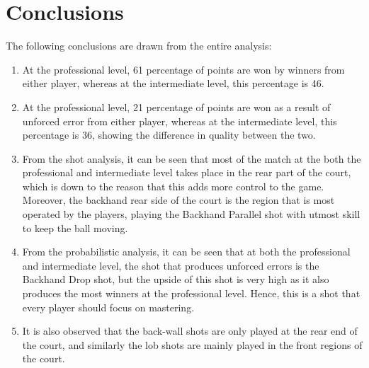 \documentclass[10pt,conference]{IEEEtran}
\begin{document}
\section{Conclusions}
The following conclusions are drawn from the entire analysis:
\begin{enumerate}
\item At the professional level, 61 percentage of points are won by winners from either player, whereas at the intermediate level, this percentage is 46.
\item At the professional level, 21 percentage of points are won as a result of unforced error from either player, whereas at the intermediate level, this percentage is 36, showing the difference in quality between the two.
\item From the shot analysis, it can be seen that most of the match at the both the professional and intermediate level takes place in the rear part of the court, which is down to the reason that this adds more control to the game. Moreover, the backhand rear side of the court is the region that is most operated by the players, playing the Backhand Parallel shot with utmost skill to keep the ball moving.
\item From the probabilistic analysis, it can be seen that at both the professional and intermediate level, the shot that produces unforced errors is the Backhand Drop shot, but the upside of this shot is very high as it also produces the most winners at the professional level. Hence, this is a shot that every player should focus on mastering. 
\item It is also observed that the back-wall shots are only played at the rear end of the court, and similarly the lob shots are mainly played in the front regions of the court.
\end{enumerate}




%
\end{document}
